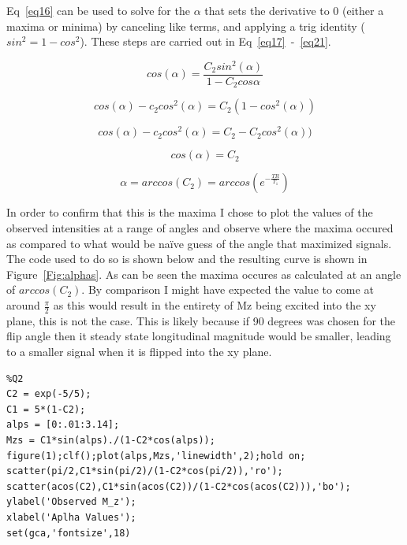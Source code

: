 \documentclass[12pt]{article}
\begin{document}
Eq~\ref{eq16} can be used to solve for the $\alpha$ that sets the derivative to 0 (either a maxima or minima) by canceling like terms, and applying a trig identity ($sin^2 = 1-cos^2$). These steps are carried out in Eq~\ref{eq17}~-~\ref{eq21}.

\begin{equation}
cos(\alpha) = \frac{C_2sin^2(\alpha)}{1-C_2cos{\alpha}}
\label{eq17}
\end{equation}

\begin{equation}
cos(\alpha) - c_2cos^2(\alpha) = C_2(1-cos^2(\alpha))
\label{eq18}
\end{equation}

\begin{equation}
cos(\alpha) - c_2cos^2(\alpha) = C_2-C_2cos^2(\alpha))
\label{eq19}
\end{equation}

\begin{equation}
cos(\alpha) = C_2
\label{eq20}
\end{equation}

\begin{equation}
\alpha = arccos(C_2) = arccos(e^{-\frac{TR}{T_1}})
\label{eq21}
\end{equation}

In order to confirm that this is the maxima I chose to plot the values of the observed intensities at a range of angles and observe where the maxima occured as compared to what would be na\"ive guess of the angle that maximized signals. The code used to do so is shown below and the resulting curve is shown in Figure~\ref{Fig:alphas}. As can be seen the maxima occures as calculated at an angle of $arccos(C_2)$. By comparison I might have expected the value to come at around $\frac{\pi}{2}$ as this would result in the entirety of Mz being excited into the xy plane, this is not the case. This is likely because if 90 degrees was chosen for the flip angle then it steady state longitudinal magnitude would be smaller, leading to a smaller signal when it is flipped into the xy plane.


\begin{lstlisting}[style=Matlab-editor]
%%
%Q2
C2 = exp(-5/5);
C1 = 5*(1-C2);
alps = [0:.01:3.14];
Mzs = C1*sin(alps)./(1-C2*cos(alps));
figure(1);clf();plot(alps,Mzs,'linewidth',2);hold on;
scatter(pi/2,C1*sin(pi/2)/(1-C2*cos(pi/2)),'ro');
scatter(acos(C2),C1*sin(acos(C2))/(1-C2*cos(acos(C2))),'bo');
ylabel('Observed M_z');
xlabel('Aplha Values');
set(gca,'fontsize',18)


\end{lstlisting}
\end{document}

